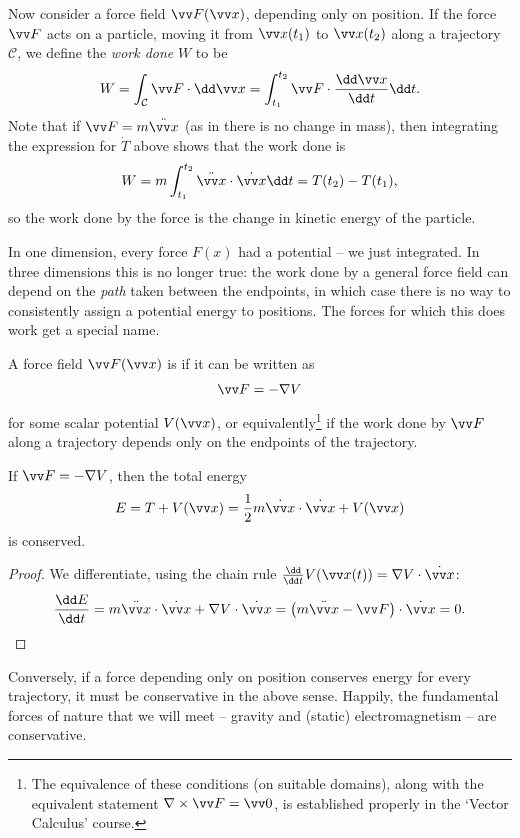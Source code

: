 Now consider a force field $\vv F(\vv x)$, depending only on position.  If the force $\vv F$ acts on a particle, moving it from $\vv x(t_1)$ to $\vv x(t_2)$ along a trajectory $\mathcal{C}$, we define the \emph{work done} $W$ to be
$$
W = \int_\mathcal{C} \vv F \cdot \dd \vv x = \int_{t_1}^{t_2} \vv F \cdot \frac{\dd \vv x}{\dd t} \dd t.
$$
Note that if $\vv F = m \ddot{\vv x}$ (as in there is no change in mass), then integrating the expression for $\dot T$ above shows that the work done is
$$
W = m \int_{t_1}^{t_2} \ddot{\vv x} \cdot \dot{\vv x} \dd t = T(t_2) - T(t_1),
$$
so the work done by the force is the change in kinetic energy of the particle.

In one dimension, every force $F(x)$ had a potential -- we just integrated. In three dimensions this is no longer true: the work done by a general force field can depend on the \emph{path} taken between the endpoints, in which case there is no way to consistently assign a potential energy to positions. The forces for which this does work get a special name.

\begin{definition}
	A force field $\vv F(\vv x)$ is  if it can be written as
	$$
	\vv F = -\nabla V
	$$
	for some scalar potential $V(\vv x)$, or equivalently\footnote{The equivalence of these conditions (on suitable domains), along with the equivalent statement $\nabla \times \vv F = \vv 0$, is established properly in the `Vector Calculus' course.} if the work done by $\vv F$ along a trajectory depends only on the endpoints of the trajectory.
\end{definition}

\begin{proposition}
	If $\vv F = -\nabla V$, then the total energy
	$$
	E = T + V(\vv x) = \frac{1}{2}m \dot{\vv x} \cdot \dot{\vv x} + V(\vv x)
	$$
	is conserved.
\end{proposition}
\begin{proof}
	We differentiate, using the chain rule $\frac{\dd}{\dd t}V(\vv x(t)) = \nabla V \cdot \dot{\vv x}$:
	\[
	\frac{\dd E}{\dd t} = m \ddot{\vv x}\cdot \dot{\vv x} + \nabla V \cdot \dot{\vv x} = \left(m \ddot{\vv x} - \vv F\right)\cdot \dot{\vv x} = 0. \qedhere
	\]
\end{proof}

Conversely, if a force depending only on position conserves energy for every trajectory, it must be conservative in the above sense. Happily, the fundamental forces of nature that we will meet -- gravity and (static) electromagnetism -- are conservative.

